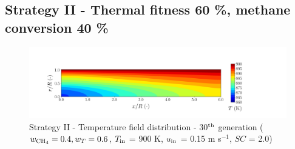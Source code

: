 \documentclass[preprint,12pt]{elsarticle}
\begin{document}



\clearpage



\subsection{Strategy II - Thermal fitness 60 \%, methane conversion 40 \%} 
\label{subsec:S24060}

%

\begin{figure}[h!]
\centering
\includegraphics[width=150mm]{results/5Eq/40C_60T/GEN30-TFIELD.png}
\caption{\label{fig:5RES4060G30-TField} Strategy II - Temperature field distribution - 30$^{\rm{th}}$ generation ($w_{\rm{CH_4}} = 0.4, w_T = 0.6$, $T_{\rm{in}}$ = 900 K, $u_{\rm{in}}$ = 0.15 m s$^{-1}$, $SC$ = 2.0)}
\end{figure}


%
\end{document}

